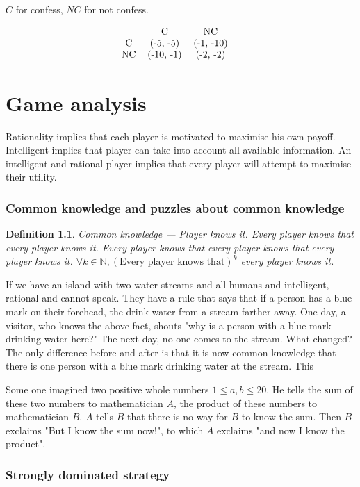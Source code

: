 \documentclass[11pt]{book}
\newcommand{\N}{\ensuremath{\mathbb{N}}}
\newtheorem{definition}[corollary]{Definition}
\begin{document}
$C$ for confess, $NC$ for not confess.

$$
\begin{tabular}{ccccc}
     & C & NC & \\
    C & (-5, -5) & (-1, -10) \\ 
    NC &  (-10, -1) & (-2, -2)
\end{tabular}
$$

\chapter{Game analysis}
Rationality implies that each player is motivated to maximise his own payoff.
Intelligent implies that player can take into account all available
information. An intelligent and rational player implies that every player will
attempt to maximise their utility.

\subsection{Common knowledge and puzzles about common knowledge}
\begin{definition}
    \emph{Common knowledge} --- Player knows it. Every player knows that every player
    knows it. Every player knows that every player knows that
    every player knows it.
    $\forall k \in \N, (\text{Every player knows that})^k$ every player knows it.
\end{definition}

If we have an island with two water streams and all humans and intelligent,
rational and cannot speak. They have a rule that says that if a person has a
blue mark on their forehead, the drink water from a stream farther away. One
day, a visitor, who knows the above fact, shouts "why is a person with a blue
mark drinking water here?" The next day, no one comes to the stream. What changed?
The only difference before and after is that it is now common knowledge that
there is one person with a blue mark drinking water at the stream. This


Some one imagined two positive whole numbers $1 \leq a, b \leq 20$. He tells the sum of these
two numbers to mathematician $A$, the product of these numbers to mathematician $B$.
$A$ tells $B$ that there is no way for $B$ to know the sum. Then $B$ exclaims
"But I know the sum now!", to which $A$ exclaims "and now I know the product".

\subsection{Strongly dominated strategy}
\end{document}
